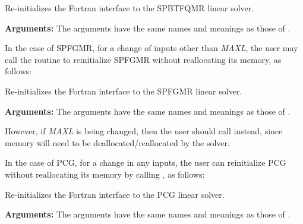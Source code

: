 \documentclass[letterpaper,10pt,english]{sphinxmanual}
\begin{document}
\begin{fulllineitems}
\label{f_interface/Usage:f/_/FARKSPTFQMRREINIT}
Re-initializes the Fortran interface to the SPBTFQMR
linear solver.

\textbf{Arguments:}  The arguments have the same names and meanings as
those of {\hyperref[f_interface/Usage:f/_/FARKSPTFQMR]{\emph{}}}.

\end{fulllineitems}


In the case of SPFGMR, for a change of inputs other than \emph{MAXL},
the user may call the routine {\hyperref[f_interface/Usage:f/_/FARKSPFGMRREINIT]{\emph{}}} to
reinitialize SPFGMR without reallocating its memory, as follows:

\begin{fulllineitems}
\label{f_interface/Usage:f/_/FARKSPFGMRREINIT}
Re-initializes the Fortran interface to the SPFGMR
linear solver.

\textbf{Arguments:}  The arguments have the same names and meanings as
those of {\hyperref[f_interface/Usage:f/_/FARKSPFGMR]{\emph{}}}.

\end{fulllineitems}


However, if \emph{MAXL} is being changed, then the user should call
{\hyperref[f_interface/Usage:f/_/FARKSPFGMR]{\emph{}}} instead, since memory will need to be
deallocated/reallocated by the solver.

In the case of PCG, for a change in any inputs, the user can
reinitialize PCG without reallocating its memory by calling
{\hyperref[f_interface/Usage:f/_/FARKPCGREINIT]{\emph{}}}, as follows:

\begin{fulllineitems}
\label{f_interface/Usage:f/_/FARKPCGREINIT}
Re-initializes the Fortran interface to the PCG
linear solver.

\textbf{Arguments:}  The arguments have the same names and meanings as
those of {\hyperref[f_interface/Usage:f/_/FARKPCG]{\emph{}}}.

\end{fulllineitems}
\end{document}
